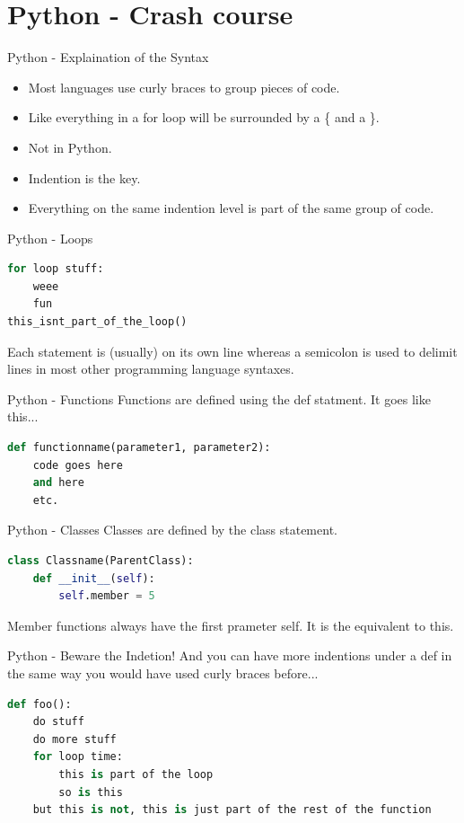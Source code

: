 \documentclass[fleqn,11pt,aspectratio=43]{beamer}
\begin{document}
\section{Python - Crash course}

\begin{frame}{Python - Explaination of the Syntax}
\begin{itemize}
  \item Most languages use curly braces to group pieces of code. 
  \item Like everything in a for loop will be surrounded by a \{ and a \}. 
  \item Not in Python. 
  \item Indention is the key. 
  \item Everything on the same indention level is part of the same group of code.
\end{itemize}
\end{frame}

\begin{frame}[fragile]{Python - Loops}
\begin{lstlisting}[language=python]
for loop stuff:
    weee
    fun
this_isnt_part_of_the_loop()
\end{lstlisting}
Each statement is (usually) on its own line whereas a semicolon is used to delimit lines in most other programming language syntaxes.
\end{frame}

\begin{frame}[fragile]{Python - Functions}
Functions are defined using the def statment. It goes like this...
\begin{lstlisting}[language=python]
def functionname(parameter1, parameter2):
    code goes here
    and here 
    etc.
\end{lstlisting}
\end{frame}

\begin{frame}[fragile]{Python - Classes}
Classes are defined by the class statement.
\begin{lstlisting}[language=python]
class Classname(ParentClass):
    def __init__(self):
        self.member = 5
\end{lstlisting}
Member functions always have the first prameter self. It is the equivalent to this.
\end{frame}

\begin{frame}[fragile]{Python - Beware the Indetion!}
And you can have more indentions under a def in the same way you would have used curly braces before...
\begin{lstlisting}[language=python]
def foo():
    do stuff
    do more stuff
    for loop time:
        this is part of the loop
        so is this
    but this is not, this is just part of the rest of the function
\end{lstlisting}
\end{frame}
\end{document}
